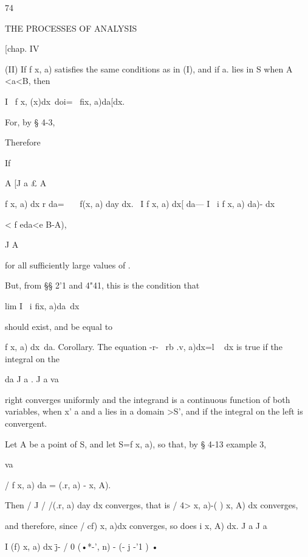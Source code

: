 74



THE PROCESSES OF ANALYSIS



[chap. IV



(II) If f x, a) satisfies the same conditions as in (I), and if a.
lies in S when A <a<B, then



I \ f x, (x)dx\ doi= \ fix, a)da[dx.



For, by § 4-3,



Therefore



If

A [J a £ A



f x, a) dx r da= \ \ \ f(x, a) day dx. \ I f x, a) dx[ da— I \ i f x,
a) da)- dx

< f eda<e B-A),

J A



for all sufficiently large values of .

But, from §§ 2'1 and 4"41, this is the condition that



lim I \ i fix, a)da\ dx



should exist, and be equal to



f x, a) dx\ da. Corollary. The equation -r- \ rb .v, a)dx=l ~ dx is
true if the integral on the

da J a . J a va

right converges uniformly and the integrand is a continuous function
of both variables, when x' a and a lies in a domain >S', and if the
integral on the left is convergent.

Let A be a point of S, and let S=f x, a), so that, by § 4-13 example
3,

va

/ f x, a) da = (.r, a) - x, A).

Then / J / /(.r, a) day dx converges, that is / 4> x, a)-( ) x, A) dx
converges,

and therefore, since / cf) x, a)dx converges, so does i x, A) dx. J a
J a

I (f) x, a) dx \=j- / 0 (•*-', n) - (- j -'1 ) •



